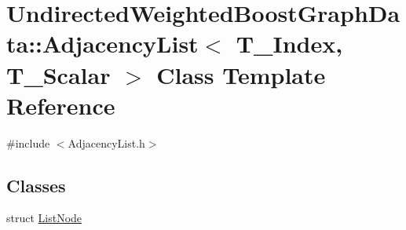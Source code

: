 \hypertarget{class_undirected_weighted_graph_1_1_adjacency_list}{\section{Undirected\+Weighted\+BoostGraphData\+:\+:Adjacency\+List$<$ T\+\_\+\+Index, T\+\_\+\+Scalar $>$ Class Template Reference}
\label{class_undirected_weighted_graph_1_1_adjacency_list}
}


{\ttfamily \#include $<$Adjacency\+List.\+h$>$}

\subsection*{Classes}
\begin{DoxyCompactItemize}
\item 
struct \hyperlink{struct_undirected_weighted_graph_1_1_adjacency_list_1_1_list_node}{List\+Node}
\end{DoxyCompactItemize}
